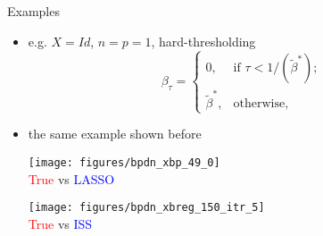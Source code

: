 \documentclass[slidestop,compress,9pt,epsfig,color]{beamer}
\theoremstyle{example}
\begin{document}
\begin{frame}{Examples}
\begin{itemize}
\item e.g. $X=Id$, $n=p=1$, hard-thresholding
\begin{equation*}
\beta_\tau=\left\{
\begin{array}{lr}
0,& \mbox{if $\tau<1/(\tilde{\beta}^*)$}; \\
\tilde{\beta}^*,& \mbox{otherwise},
\end{array}
\right.
\end{equation*}
\item the same example shown before
\begin{center}
      \begin{minipage}[b]{0.4\textwidth}
       \centering
      \texttt{[image: figures/bpdn\_xbp\_49\_0]}\\
      \textcolor{red}{True} vs \textcolor{blue}{LASSO} 
     \end{minipage}
     \begin{minipage}[b]{0.4\textwidth}
      \centering
      \texttt{[image: figures/bpdn\_xbreg\_150\_itr\_5]}\\
      \textcolor{red}{True} vs  \textcolor{blue}{ISS} ~
     \end{minipage}
\end{center}
\end{itemize}
\end{frame}
\end{document}
